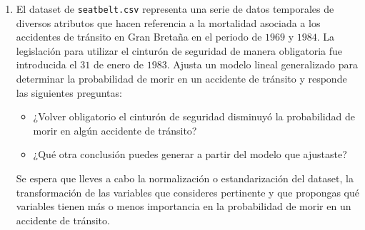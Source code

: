 \documentclass[letterpaper,11pt]{article}
\begin{document}
\begin{enumerate}
    \item El dataset de \texttt{seatbelt.csv} representa una serie de datos 
    temporales de diversos atributos que hacen referencia a la mortalidad 
    asociada a los accidentes de tránsito en Gran Bretaña en el periodo de 
    $1969$ y $1984$. La legislación para utilizar el cinturón de seguridad de 
    manera obligatoria fue introducida el $31$ de enero de $1983$. Ajusta un 
    modelo lineal generalizado para determinar la probabilidad de morir en 
    un accidente de tránsito y responde las siguientes preguntas:
    \begin{itemize}
        \item ¿Volver obligatorio el cinturón de seguridad disminuyó la 
        probabilidad de morir en algún accidente de tránsito?

        \item ¿Qué otra conclusión puedes generar a partir del modelo que 
        ajustaste? 
    \end{itemize}

    Se espera que lleves a cabo la normalización o estandarización del 
    dataset, la transformación de las variables que consideres pertinente y 
    que propongas qué variables tienen más o menos importancia en la 
    probabilidad de morir en un accidente de tránsito.
\end{enumerate}
\end{document}
